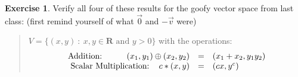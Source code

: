 \documentclass{beamer}
\newcommand{\R}{\mathbf{R}}
\newcommand{\vecv}{\vec{v}}
\newcommand{\zerovector}{\vec{0}}
\newcommand{\fn}{\insertframenumber}
\theoremstyle{definition}
\newtheorem{exercise}{Exercise}
\begin{document}
\begin{frame}{\fn}
\begin{exercise}
	Verify all four of these results for the goofy vector space from last class: (first remind yourself of what $\zerovector$ and $-\vecv$ were)
	\begin{quote}
		$V=\{(x,y)\ :\ x,y\in\R \text{ and }y> 0\}$ with the operations:
		$$\begin{array}{rcl}	
		\text{Addition: \hspace*{.35in}} (x_1,y_1)\oplus (x_2,y_2)&=&(x_1+x_2,y_1y_2)\\
		\text{Scalar Multiplication: \hspace*{.1in}} c*(x,y)&=&(cx,y^c)
		\end{array}$$
	\end{quote}
\end{exercise}
\end{frame}
\end{document}
